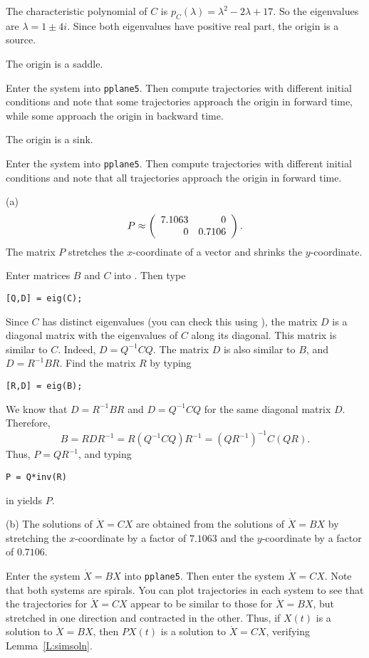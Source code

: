 \documentclass{ximera}
\begin{document}
\soln The characteristic polynomial of $C$ is
$p_C(\lambda) = \lambda^2 - 2\lambda + 17$.  So the eigenvalues are
$\lambda = 1 \pm 4i$.  Since both eigenvalues have positive real part,
the origin is a source.

\newpage
{} \ans The origin is a saddle.

\soln Enter the system into {\tt pplane5}.  Then compute trajectories with
different initial conditions and note that some trajectories approach the
origin in forward time, while some approach the origin in backward time.

 \ans The origin is a sink.

\soln Enter the system into {\tt pplane5}.  Then compute trajectories with
different initial conditions and note that all trajectories approach
the origin in forward time.

(a) \ans
\[
P \approx \left(\begin{array}{rr} 7.1063 & 0\\ 0 &0.7106\end{array}\right).
\]
The matrix $P$ stretches the $x$-coordinate of a vector and shrinks the
$y$-coordinate.

\soln Enter matrices $B$ and $C$ into \Matlabp.  Then type
\begin{verbatim}
[Q,D] = eig(C);
\end{verbatim}
Since $C$ has distinct eigenvalues (you can check this using
\Matlabp), the matrix $D$ is a diagonal matrix with the eigenvalues of
$C$ along its diagonal.  This matrix is similar to $C$.  Indeed, $D =
Q^{-1}CQ$.  The matrix $D$ is also similar to $B$, and $D= R^{-1}BR$.
Find the matrix $R$ by typing
\begin{verbatim}
[R,D] = eig(B);
\end{verbatim}
We know that $D = R^{-1}BR$ and $D = Q^{-1}CQ$ for the same diagonal
matrix $D$.  Therefore,
\[
B = RDR^{-1} = R(Q^{-1}CQ)R^{-1} = (QR^{-1})^{-1}C(QR).
\]
Thus, $P = QR^{-1}$, and typing
\begin{verbatim}
P = Q*inv(R)
\end{verbatim}
in \Matlab yields $P$.

(b) \ans The solutions of $\dot{X} = CX$ are obtained from the solutions
of $\dot{X} = BX$ by stretching the $x$-coordinate by a factor of $7.1063$
and the $y$-coordinate by a factor of $0.7106$.

\soln Enter the system $\dot{X} = BX$ into {\tt pplane5}.  Then enter the
system $\dot{X} = CX$.  Note that both systems are spirals.  You can
plot trajectories in each system to see that the trajectories for
$\dot{X} = CX$ appear to be similar to those for $\dot{X} = BX$, but
stretched in one direction and contracted in the other.  Thus, if
$X(t)$ is a solution to $\dot{X} = BX$, then $PX(t)$ is a solution to
$\dot{X} = CX$, verifying Lemma~\ref{L:simsoln}.
\end{document}
